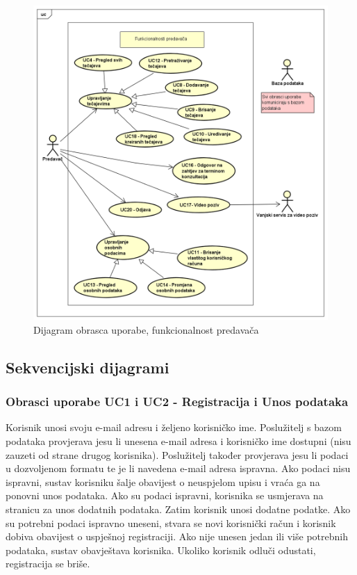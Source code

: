 					\begin{figure}[h]
						\includegraphics[scale=0.55]{dijagrami/UML_pred.PNG}
						\centering
						\caption{Dijagram obrasca uporabe, funkcionalnost predavača}
						\label{fig:UML_pred}
					\end{figure}
				\eject			
				
			\subsection{Sekvencijski dijagrami}
				
				\subsubsection{Obrasci uporabe UC1 i UC2 - Registracija i Unos podataka}
				
					Korisnik unosi svoju e-mail adresu i željeno korisničko ime. Poslužitelj s bazom podataka provjerava jesu li unesena e-mail adresa i korisničko ime dostupni (nisu zauzeti od strane drugog korisnika). Poslužitelj također provjerava jesu li podaci u dozvoljenom formatu te je li navedena e-mail adresa ispravna. Ako podaci nisu ispravni, sustav korisniku šalje obavijest o neuspjelom upisu i vraća ga na ponovni unos podataka. Ako su podaci ispravni, korisnika se usmjerava na stranicu za unos dodatnih podataka. \newline
					Zatim korisnik unosi dodatne podatke. Ako su potrebni podaci ispravno uneseni, stvara se novi korisnički račun i korisnik dobiva obavijest o uspješnoj registraciji. Ako nije unesen jedan ili više potrebnih podataka, sustav obavještava korisnika. Ukoliko korisnik odluči odustati, registracija se briše.
				\eject
				
